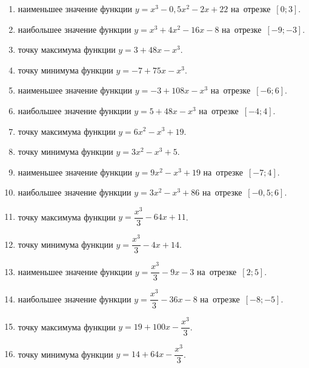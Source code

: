\documentclass[a4paper,10pt]{article}
\begin{document}
\begin{enumerate}
\item {} наименьшее значение функции $y=x^3 -0,5x^2-2x+22$ на~отрезке~$\left[0;3\right]$.

\item {} наибольшее значение функции $y=x^3 +4x^2-16x-8$ на~отрезке~$\left[-9;-3\right]$.

\item {} точку максимума функции $y=3+48x-x^3$.

\item {} точку минимума функции $y=-7+75x-x^3$.

\item {} наименьшее значение функции $y=-3+108x-x^3$ на~отрезке~$\left[-6;6\right]$.

\item {} наибольшее значение функции $y=5+48x-x^3$ на~отрезке~$\left[-4;4\right]$.

\item {} точку максимума функции $y=6x^2-x^3+19$.

\item {} точку минимума функции $y=3x^2-x^3+5$.

\item {} наименьшее значение функции $y=9x^2-x^3+19$ на~отрезке~$\left[-7;4\right]$.

\item {} наибольшее значение функции $y=3x^2-x^3+86$ на~отрезке~$\left[-0,5;6\right]$.

\item {} точку максимума функции $y=\dfrac{x^3}{3} -64x+11$.

\item {} точку минимума функции $y=\dfrac{x^3}{3} -4x+14$.

\item {} наименьшее значение функции $y=\dfrac{x^3}{3} -9x-3$ на~отрезке~$\left[2;5\right]$.

\item {} наибольшее значение функции $y=\dfrac{x^3}{3} -36x-8$ на~отрезке~$\left[-8;-5\right]$.

\item {} точку максимума функции $y=19 +100x-\dfrac{x^3}{3}$.

\item {} точку минимума функции $y=14 +64x-\dfrac{x^3}{3}$.


\end{enumerate}
\end{document}
